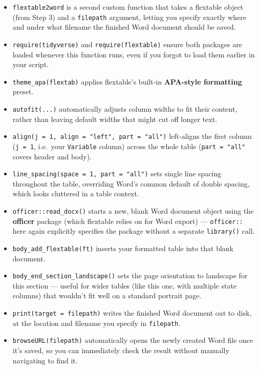\documentclass[
  letterpaper,
  DIV=11,
  numbers=noendperiod]{scrreprt}
\begin{document}
\begin{itemize}
\item
  \texttt{flextable2word} is a second custom function that takes a
  flextable object (from Step 3) and a \texttt{filepath} argument,
  letting you specify exactly where and under what filename the finished
  Word document should be saved.
\item
  \texttt{require(tidyverse)} and \texttt{require(flextable)} ensure
  both packages are loaded whenever this function runs, even if you
  forgot to load them earlier in your script.
\item
  \texttt{theme\_apa(flextab)} applies flextable's built-in
  \textbf{APA-style formatting} preset.
\item
  \texttt{autofit(...)} automatically adjusts column widths to fit their
  content, rather than leaving default widths that might cut off longer
  text.
\item
  \texttt{align(j\ =\ 1,\ align\ =\ "left",\ part\ =\ "all")}
  left-aligns the first column (\texttt{j\ =\ 1}, i.e.~your
  \texttt{Variable} column) across the whole table
  (\texttt{part\ =\ "all"} covers header and body).
\item
  \texttt{line\_spacing(space\ =\ 1,\ part\ =\ "all")} sets single line
  spacing throughout the table, overriding Word's common default of
  double spacing, which looks cluttered in a table context.
\item
  \texttt{officer::read\_docx()} starts a new, blank Word document
  object using the \textbf{officer} package (which flextable relies on
  for Word export) --- \texttt{officer::} here again explicitly
  specifies the package without a separate \texttt{library()} call.
\item
  \texttt{body\_add\_flextable(ft)} inserts your formatted table into
  that blank document.
\item
  \texttt{body\_end\_section\_landscape()} sets the page orientation to
  landscape for this section --- useful for wider tables (like this one,
  with multiple state columns) that wouldn't fit well on a standard
  portrait page.
\item
  \texttt{print(target\ =\ filepath)} writes the finished Word document
  out to disk, at the location and filename you specify in
  \texttt{filepath}.
\item
  \texttt{browseURL(filepath)} automatically opens the newly created
  Word file once it's saved, so you can immediately check the result
  without manually navigating to find it.
\end{itemize}
\end{document}
